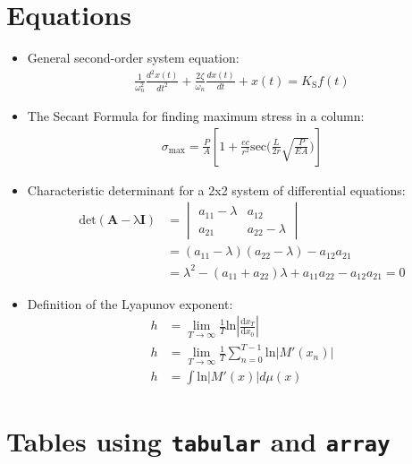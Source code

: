 \documentclass{article}
\begin{document}
\section{Equations} %
\begin{itemize}
\item General second-order system equation\cite[p.~221]{Rizzoni}:
\begin{align*}
\frac{1}{\omega^2_n}\frac{d^2x(t)}{dt^2}+\frac{2\zeta}{\omega_n}\frac{dx(t)}{dt}+x(t)=K_\mathrm{S}f(t)
\end{align*}
\item The Secant Formula for finding maximum stress 
in a column\cite[p.~681]{Hibbeler}:
\begin{align*}
\sigma_\mathrm{max}=\frac{P}{A}\left[1+\frac{ec}{r^2}\mathrm{sec}\Bigg(\frac{L}{2r}\sqrt{\frac{P}{EA}}\Bigg)\right]
\end{align*}
\item Characteristic determinant for a 2x2 system of 
differential equations\cite[p.~152]{Kreyszig}:
\begin{align}
\nonumber \mathrm{det\left(\textbf{A}-\lambda\textbf{I}\right)} &= 
\begin{vmatrix}
a_{11}-\lambda & a_{12}  \\
a_{21} & a_{22}-\lambda
\end{vmatrix}  \\
\nonumber &=(a_{11}-\lambda)(a_{22}-\lambda)-a_{12}a_{21} \\ 
&=\lambda^2-(a_{11}+a_{22})\lambda+a_{11}a_{22}-a_{12}a_{21}=0
\end{align}
\item Definition of the Lyapunov exponent\cite[p.~56]{Ott}:
\begin{align}
h&=\lim_{T\to\infty}\frac{1}{T}\mathrm{ln}
\left|
\frac{\mathrm{d}x_T}{\mathrm{d}x_0}
\right| \\
h&=\lim_{T\to\infty}\frac{1}{T}\sum_{n=0}^{T-1}
\mathrm{ln}
\left|M'(x_n)
\right| \\
h&=\int\mathrm{ln}\left|M'(x)
\right|
d\mu(x)
\end{align}
\end{itemize}

\section{Tables using {\tt tabular} and {\tt array}}
\end{document}
